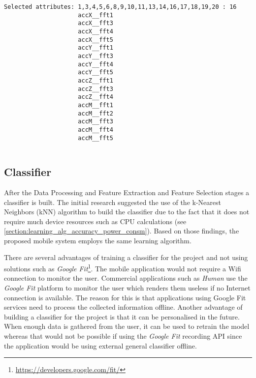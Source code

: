     \begin{lstlisting}[caption=\gls{cfs} algorithm result over the initial feature set of size 20,
    frame=tlrbr,
    basicstyle=\small,
    captionpos=b,
    label=cfs-algorithm-result]
    Selected attributes: 1,3,4,5,6,8,9,10,11,13,14,16,17,18,19,20 : 16
                     accX__fft1
                     accX__fft3
                     accX__fft4
                     accX__fft5
                     accY__fft1
                     accY__fft3
                     accY__fft4
                     accY__fft5
                     accZ__fft1
                     accZ__fft3
                     accZ__fft4
                     accM__fft1
                     accM__fft2
                     accM__fft3
                     accM__fft4
                     accM__fft5
    
    \end{lstlisting}
    
    \subsection{Classifier}
    \label{section:classifier}
    After the Data Processing and Feature Extraction and Feature Selection stages a classifier is built. The initial research suggested the use of the k-Nearest Neighbors (kNN) algorithm to build the classifier due to the fact that it does not require much device resources such as CPU calculations (see \ref{section:learning_alg_accuracy_power_consm}). Based on those findings, the proposed mobile system  employs the same learning algorithm.
    
    There are several advantages of training a classifier for the project and not using solutions such as \textit{Google Fit}\footnote{\url{https://developers.google.com/fit/}}. The mobile application would not require a Wifi connection to monitor the user. Commercial applications such as \textit{Human} \citep{human2017} use the \textit{Google Fit} platform to monitor the user which renders them useless if no Internet connection is available. The reason for this is that applications using Google Fit services need to process the collected information offline. Another advantage of building a classifier for the project is that it can be personalised in the future. When enough data is gathered from the user, it can be used to retrain the model whereas that would not be possible if using the \textit{Google Fit} recording API since the application would be using external general classifier offline. 
    
